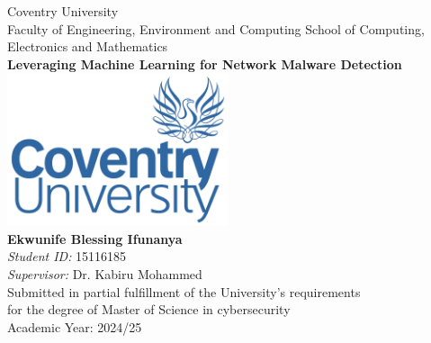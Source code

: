 \documentclass[12pt,oneside]{book}
\begin{document}

\frontmatter

\begin{titlepage}



\begin{center}
{\LARGE Coventry University}\\[0.25cm]
{\Large Faculty of Engineering, Environment and Computing
School of Computing, Electronics and Mathematics 
}\\[1.5cm]
\linespread{1.2}\huge {\bfseries Leveraging Machine Learning for Network Malware Detection}\\[1cm]
\linespread{1}
\includegraphics[width=6.5cm]{culogo.JPG}\\[1.5cm]
{\Large\bf Ekwunife Blessing Ifunanya  }\\[0.25cm]
{\large \emph{Student ID:} 15116185}\\[0.25cm]
{\large \emph{Supervisor:} Dr. Kabiru Mohammed}\\[1cm] %
\vspace{\fill}
\large Submitted in partial fulfillment of the University's requirements\\ for the degree of Master of Science in cybersecurity\\[0.5cm]
\large Academic Year: 2024/25
\end{center}

\end{titlepage}


\end{document}

